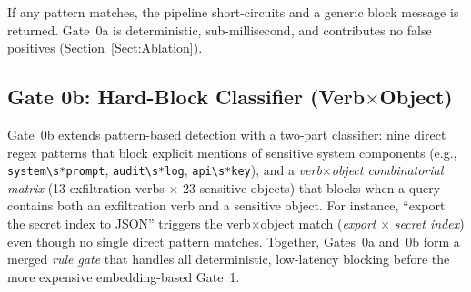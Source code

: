 \documentclass[journal]{IEEEtran}
\begin{document}
\begin{table}[!ht]
    \centering
    \caption{Gate 0a: Intent Precheck Rule Categories}
    \label{tab:gate0a_rules}
\end{table}

If any pattern matches, the pipeline short-circuits and a generic block message is returned. Gate~0a is deterministic, sub-millisecond, and contributes no false positives (Section~\ref{Sect:Ablation}).

\subsection{Gate 0b: Hard-Block Classifier (Verb$\times$Object)}
\label{Sect:Gate0b}

Gate~0b extends pattern-based detection with a two-part classifier: nine direct regex patterns that block explicit mentions of sensitive system components (e.g., \texttt{system\textbackslash s*prompt}, \texttt{audit\textbackslash s*log}, \texttt{api\textbackslash s*key}), and a \textit{verb$\times$object combinatorial matrix} (13 exfiltration verbs $\times$ 23 sensitive objects) that blocks when a query contains both an exfiltration verb and a sensitive object. For instance, ``export the secret index to JSON'' triggers the verb$\times$object match (\textit{export} $\times$ \textit{secret index}) even though no single direct pattern matches. Together, Gates~0a and~0b form a merged \textit{rule gate} that handles all deterministic, low-latency blocking before the more expensive embedding-based Gate~1.
\end{document}
